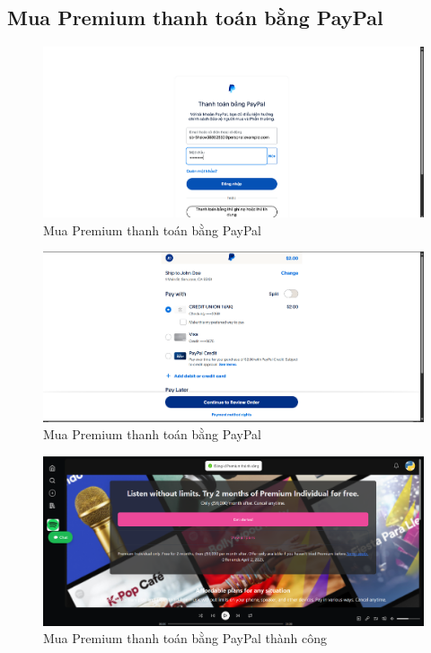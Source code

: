 \subsection{Mua Premium thanh toán bằng PayPal}
\begin{figure}[H]
    \centering
    \includegraphics[width=1\textwidth]{imgs/chap5/premium_2.png}
    \caption{Mua Premium thanh toán bằng PayPal}
\end{figure}
\begin{figure}[H]
    \centering
    \includegraphics[width=1\textwidth]{imgs/chap5/premium_2_1.png}
    \caption{Mua Premium thanh toán bằng PayPal}
\end{figure}
\begin{figure}[H]
    \centering
    \includegraphics[width=1\textwidth]{imgs/chap5/premium_2_2.png}
    \caption{Mua Premium thanh toán bằng PayPal thành công}
\end{figure}


